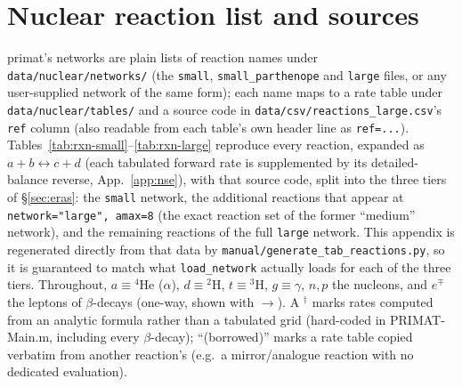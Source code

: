 \documentclass[11pt,a4paper]{article}
\newcommand{\code}[1]{\texttt{#1}}
\begin{document}
\section{Nuclear reaction list and sources}\label{app:reactions}
primat's networks are plain lists of reaction names under
\code{data/nuclear/networks/} (the \code{small}, \code{small\_parthenope} and
\code{large} files, or any user-supplied network of the same form); each name
maps to a rate table under \code{data/nuclear/tables/} and a source code in
\code{data/csv/reactions\_large.csv}'s \code{ref} column (also readable from
each table's own header line as \code{ref=...}).
Tables~\ref{tab:rxn-small}--\ref{tab:rxn-large} reproduce every reaction,
expanded as $a+b\leftrightarrow c+d$ (each tabulated forward rate is supplemented
by its detailed-balance reverse, App.~\ref{app:nse}), with that source code,
split into the three tiers of \S\ref{sec:eras}: the \code{small} network, the
additional reactions that appear at \code{network="large", amax=8} (the exact
reaction set of the former ``medium'' network), and the remaining reactions
of the full \code{large} network. This appendix is regenerated directly from
that data by \code{manual/generate\_tab\_reactions.py}, so it is guaranteed to
match what \code{load\_network} actually loads for each of the three tiers.
Throughout, $a\equiv{}^4$He ($\alpha$), $d\equiv{}^2$H, $t\equiv{}^3$H,
$g\equiv\gamma$, $n,p$ the nucleons, and $e^\mp$ the leptons of $\beta$-decays
(one-way, shown with $\to$). A $^\dagger$ marks rates computed from an
analytic formula rather than a tabulated grid (hard-coded in PRIMAT-Main.m,
including every $\beta$-decay); ``(borrowed)'' marks a rate table copied
verbatim from another reaction's (e.g.\ a mirror/analogue reaction with no
dedicated evaluation).
\end{document}
